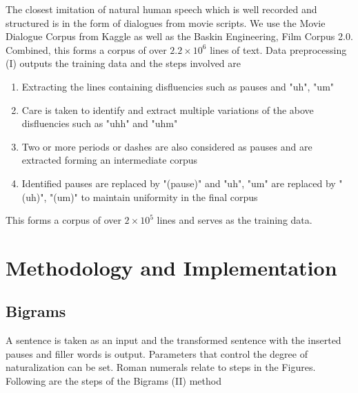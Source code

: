 \documentclass[journal]{IEEEtran}
\begin{document}
The closest imitation of natural human speech which is well recorded and structured is in the form of dialogues from movie scripts. We use the Movie Dialogue Corpus from Kaggle\cite{cornell} as well as the Baskin Engineering, Film Corpus 2.0\cite{ucsc}. Combined, this forms a corpus of over $2.2 \times 10^{6}$ lines of text. Data preprocessing (I) outputs the training data and the steps involved are
\begin{enumerate}
    \item Extracting the lines containing disfluencies such as pauses and "uh", "um"
    \item Care is taken to identify and extract multiple variations of the above disfluencies such as "uhh" and "uhm"
    \item Two or more periods or dashes are also considered as pauses and are extracted forming an intermediate corpus
    \item Identified pauses are replaced by "(pause)" and "uh", "um" are replaced by "(uh)", "(um)" to maintain uniformity in the final corpus
\end{enumerate}
This forms a corpus of over $2 \times 10^{5}$ lines and serves as the training data.

\section{Methodology and Implementation}
\subsection{Bigrams}
A sentence is taken as an input and the transformed sentence with the inserted pauses and filler words is output. Parameters that control the degree of naturalization can be set. Roman numerals relate to steps in the Figures. Following are the steps of the Bigrams (II) method
\end{document}
